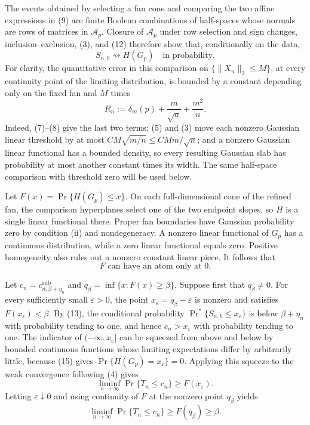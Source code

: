 The events obtained by selecting a fan cone and comparing the two affine expressions in (9) are finite Boolean combinations of half-spaces whose normals are rows of matrices in \(\mathcal A_p\).  Closure of \(\mathcal A_p\) under row selection and sign changes, inclusion--exclusion, (3), and (12) therefore show that, conditionally on the data,
\[
S_{n,b}\rightsquigarrow H(G_p)
\quad\text{in probability}.
\tag{13}
\]
For clarity, the quantitative error in this comparison on \(\{\|X_n\|_2\leq M\}\), at every continuity point of the limiting distribution, is bounded by a constant depending only on the fixed fan and \(M\) times
\[
R_n:=\delta_m(p)+\frac m{\sqrt n}+\frac{m^2}{n}.
\tag{14}
\]
Indeed, (7)--(8) give the last two terms; (5) and (3) move each nonzero Gaussian linear threshold by at most \(C M\sqrt{m/n}\leq C M m/\sqrt n\); and a nonzero Gaussian linear functional has a bounded density, so every resulting Gaussian slab has probability at most another constant times its width.  The same half-space comparison with threshold zero will be used below.

Let \(F(x)=\Pr\{H(G_p)\leq x\}\).  On each full-dimensional cone of the refined fan, the comparison hyperplanes select one of the two endpoint slopes, so \(H\) is a single linear functional there.  Proper fan boundaries have Gaussian probability zero by condition (ii) and nondegeneracy.  A nonzero linear functional of \(G_p\) has a continuous distribution, while a zero linear functional equals zero.  Positive homogeneity also rules out a nonzero constant linear piece.  It follows that
\[
F\text{ can have an atom only at }0.
\tag{15}
\]

Let \(c_n=c^{\mathrm{sub}}_{n,\beta+\eta_n}\) and \(q_\beta=\inf\{x:F(x)\geq\beta\}\).  Suppose first that \(q_\beta\neq0\).  For every sufficiently small \(\varepsilon>0\), the point \(x_\varepsilon=q_\beta-\varepsilon\) is nonzero and satisfies \(F(x_\varepsilon)<\beta\).  By (13), the conditional probability \(\Pr^*\{S_{n,b}\leq x_\varepsilon\}\) is below \(\beta+\eta_n\) with probability tending to one, and hence \(c_n>x_\varepsilon\) with probability tending to one.  The indicator of \(( -\infty,x_\varepsilon]\) can be squeezed from above and below by bounded continuous functions whose limiting expectations differ by arbitrarily little, because (15) gives \(\Pr\{H(G_p)=x_\varepsilon\}=0\).  Applying this squeeze to the weak convergence following (4) gives
\[
\liminf_{n\to\infty}\Pr\{T_n\leq c_n\}
\geq F(x_\varepsilon).
\]
Letting \(\varepsilon\downarrow0\) and using continuity of \(F\) at the nonzero point \(q_\beta\) yields
\[
\liminf_{n\to\infty}\Pr\{T_n\leq c_n\}\geq F(q_\beta)\geq\beta.
\tag{16}
\]

